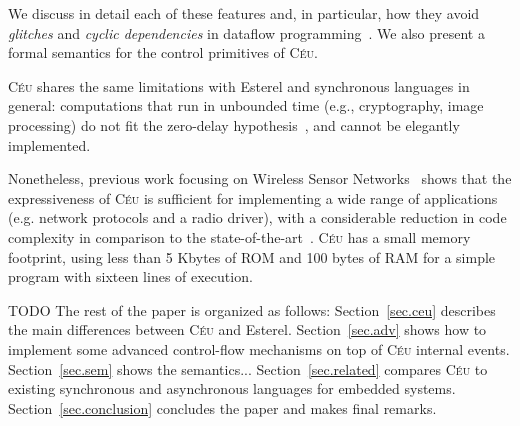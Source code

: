 \documentclass{acm_proc_article-sp}
\newcommand{\CEU}{\textsc{C\'{e}u}\xspace}
\newcommand{\1}{\;}
\newcommand{\2}{\;\;}
\newcommand{\3}{\;\;\;}
\newcommand{\5}{\;\;\;\;\;}
\begin{document}
We discuss in detail each of these features and, in particular, how they avoid 
\emph{glitches} and \emph{cyclic dependencies} in dataflow 
programming~\cite{frp.survey}.
We also present a formal semantics for the control primitives of \CEU.

\CEU shares the same limitations with Esterel and synchronous languages in 
general:
computations that run in unbounded time (e.g., cryptography, image processing) 
do not fit the zero-delay hypothesis~\cite{rp.hypothesis}, and cannot be 
elegantly implemented.

Nonetheless, previous work focusing on Wireless Sensor 
Networks~\cite{ceu.sensys} shows that the expressiveness of \CEU is sufficient 
for implementing a wide range of applications (e.g. network protocols and a 
radio driver), with a considerable reduction in code complexity in comparison 
to the state-of-the-art~\cite{wsn.nesc}.
%
\CEU has a small memory footprint, using less than 5 Kbytes of ROM and 100 
bytes of RAM for a simple program with sixteen lines of execution.

TODO
The rest of the paper is organized as follows:
Section~\ref{sec.ceu} describes the main differences between \CEU and 
Esterel.
Section~\ref{sec.adv} shows how to implement some advanced control-flow 
mechanisms on top of \CEU internal events.
Section~\ref{sec.sem} shows the semantics...
Section~\ref{sec.related} compares \CEU to existing synchronous and 
asynchronous languages for embedded systems.
Section~\ref{sec.conclusion} concludes the paper and makes final remarks.

\begin{comment}
In this work, we present \CEU, a reactive language targeting embedded systems 
that unifies both imperative and dataflow synchronous programming styles.
\CEU is based on a small set of reactive control primitives similar in 
functionality to Esterel's \cite{esterel.design}.
On top of this kernel, \CEU provides disciplined side effects, which together 
with internal events enable dataflow capabilities to the language.

Although, the first two items are similar, they are orthogonal.
One is at compile time, the other runtime.
Even without the first, the second is still valid.
The first warns about suspicious programs that still execute deterministically.

In our discussion, shared memory concerns not only variables, but also 
low-level accesses that ultimately use shared resources in the underlying 
platform (e.g., memory-mapped ports for I/O).

The stacked execution for internal events introduces support for a restricted 
form of subroutines that cannot express recursive definitions (either directly 
or indirectly), resulting in memory-bounded programs that preclude stack 
overflows.
\end{comment}
\end{document}
